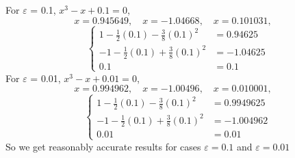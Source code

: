 \documentclass[12pt]{article}
\newcommand{\e}{\varepsilon}
\newenvironment{solution}[1][Solution]{\begin{trivlist}
  \item[\hskip \labelsep {\bfseries #1} \hskip \labelsep]}{\end{trivlist}}
\theoremstyle{remark}
\begin{document}
\begin{solution}
  $ $\\
  For \(\e\) = 0.1, \(x^3 - x + 0.1 = 0\), 
  \[
    x = 0.945649, \quad    
    x = -1.04668, \quad
    x = 0.101031, \quad
  \]
  \[
    \left\{
      \begin{array}{ll}
        1-\tfrac{1}{2}(0.1)-\tfrac{3}{8}(0.1)^2  &= 0.94625\\
        -1-\tfrac{1}{2}(0.1)+\tfrac{3}{8}(0.1)^2 &= -1.04625\\
        0.1 &= 0.1
      \end{array}
    \right.
  \]
  For \(\e\) = 0.01, \(x^3 - x + 0.01 = 0\), 
  \[
    x = 0.994962, \quad    
    x = -1.00496, \quad
    x = 0.010001, \quad
  \]
  \[
    \left\{
      \begin{array}{ll}
        1-\tfrac{1}{2}(0.1)-\tfrac{3}{8}(0.1)^2  &= 0.9949625\\
        -1-\tfrac{1}{2}(0.1)+\tfrac{3}{8}(0.1)^2 &= -1.004962\\
        0.01 &= 0.01
      \end{array}
    \right.
  \]
  $ $\\
  So we get reasonably accurate results for cases \(\e = 0.1\) and \(\e = 0.01\)

\end{solution}
\end{document}
